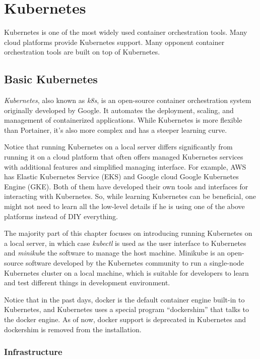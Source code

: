\chapter{Kubernetes}

Kubernetes is one of the most widely used container orchestration tools. Many cloud platforms provide Kubernetes support. Many opponent container orchestration tools are built on top of Kubernetes.

\section{Basic Kubernetes}

\textit{Kubernetes}, also known as \textit{k8s}, is an open-source container orchestration system originally developed by Google. It automates the deployment, scaling, and management of containerized applications. While Kubernetes is more flexible than Portainer, it's also more complex and has a steeper learning curve.

Notice that running Kubernetes on a local server differs significantly from running it on a cloud platform that often offers managed Kubernetes services with additional features and simplified managing interface. For example, AWS has Elastic Kubernetes Service (EKS) and Google cloud Google Kubernetes Engine (GKE). Both of them have developed their own tools and interfaces for interacting with Kubernetes. So, while learning Kubernetes can be beneficial, one might not need to learn all the low-level details if he is using one of the above platforms instead of DIY everything.

The majority part of this chapter focuses on introducing running Kubernetes on a local server, in which case \textit{kubectl} is used as the user interface to Kubernetes and \textit{minikube} the software to manage the host machine. Minikube is an open-source software developed by the Kubernetes community to run a single-node Kubernetes cluster on a local machine, which is suitable for developers to learn and test different things in development environment.

Notice that in the past days, docker is the default container engine built-in to Kubernetes, and Kubernetes uses a special program ``dockershim'' that talks to the docker engine. As of now, docker support is deprecated in Kubernetes and dockershim is removed from the installation.

\subsection{Infrastructure}

